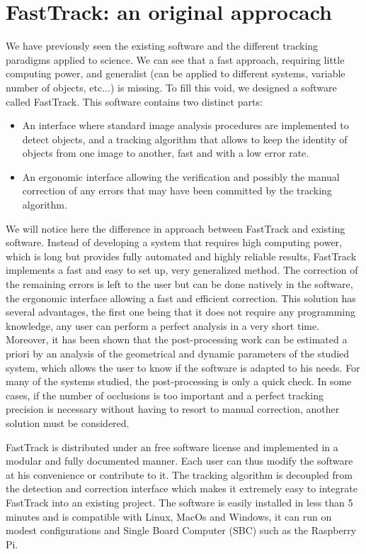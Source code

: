     \section{FastTrack: an original approcach}
    We have previously seen the existing software and the different tracking paradigms applied to science. We can see that a fast approach, requiring little computing power, and generalist (can be applied to different systems, variable number of objects, etc...) is missing.
    To fill this void, we designed a software called FastTrack. This software contains two distinct parts:
    \begin{itemize}
        \item An interface where standard image analysis procedures are implemented to detect objects, and a tracking algorithm that allows to keep the identity of objects from one image to another, fast and with a low error rate.
        \item An ergonomic interface allowing the verification and possibly the manual correction of any errors that may have been committed by the tracking algorithm.
    \end{itemize}
    We will notice here the difference in approach between FastTrack and existing software. Instead of developing a system that requires high computing power, which is long but provides fully automated and highly reliable results, FastTrack implements a fast and easy to set up, very generalized method. The correction of the remaining errors is left to the user but can be done natively in the software, the ergonomic interface allowing a fast and efficient correction.
    This solution has several advantages, the first one being that it does not require any programming knowledge, any user can perform a perfect analysis in a very short time. Moreover, it has been shown that the post-processing work can be estimated a priori by an analysis of the geometrical and dynamic parameters of the studied system, which allows the user to know if the software is adapted to his needs. For many of the systems studied, the post-processing is only a quick check. In some cases, if the number of occlusions is too important and a perfect tracking precision is necessary without having to resort to manual correction, another solution must be considered.

    FastTrack is distributed under an free software license and implemented in a modular and fully documented manner. Each user can thus modify the software at his convenience or contribute to it. The tracking algorithm is decoupled from the detection and correction interface which makes it extremely easy to integrate FastTrack into an existing project. The software is easily installed in less than 5 minutes and is compatible with Linux, MacOs and Windows, it can run on modest configurations and Single Board Computer (SBC) such as the Raspberry Pi.


